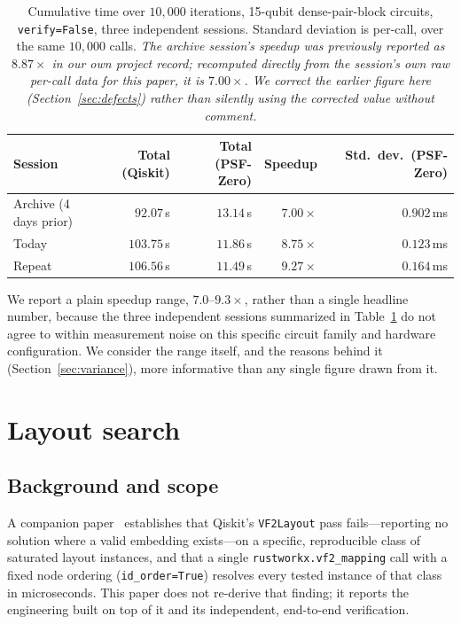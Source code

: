\documentclass[11pt]{article}
\begin{document}
\begin{table}[h]
\centering
\begin{tabular}{lrrrr}
\toprule
Session & Total (Qiskit) & Total (PSF-Zero) & Speedup & Std.\ dev.\ (PSF-Zero) \\
\midrule
Archive (4 days prior) & $92.07$\,s & $13.14$\,s & $7.00\times$ & $0.902$\,ms \\
Today & $103.75$\,s & $11.86$\,s & $8.75\times$ & $0.123$\,ms \\
Repeat & $106.56$\,s & $11.49$\,s & $9.27\times$ & $0.164$\,ms \\
\bottomrule
\end{tabular}
\caption{Cumulative time over $10{,}000$ iterations, 15-qubit
dense-pair-block circuits, \texttt{verify=False}, three independent
sessions. Standard deviation is per-call, over the same $10{,}000$
calls. \emph{The archive session's speedup was previously reported as
$8.87\times$ in our own project record; recomputed directly from the
session's own raw per-call data for this paper, it is $7.00\times$. We
correct the earlier figure here (Section~\ref{sec:defects}) rather than
silently using the corrected value without comment.}}
\label{tab:synth-perf}
\end{table}

We report a plain speedup range, $7.0$--$9.3\times$, rather than a
single headline number, because the three independent sessions
summarized in Table~\ref{tab:synth-perf} do not agree to within
measurement noise on this specific circuit family and hardware
configuration. We consider the range itself, and the reasons behind
it (Section~\ref{sec:variance}), more informative than any single
figure drawn from it.

\section{Layout search}
\label{sec:layout}

\subsection{Background and scope}

A companion paper~\cite{vf2cliff} establishes that Qiskit's
\texttt{VF2Layout} pass fails---reporting no solution where a valid
embedding exists---on a specific, reproducible class of saturated
layout instances, and that a single \texttt{rustworkx.vf2\_mapping}
call with a fixed node ordering (\texttt{id\_order=True}) resolves
every tested instance of that class in microseconds. This paper does
not re-derive that finding; it reports the engineering built on top of
it and its independent, end-to-end verification.
\end{document}
